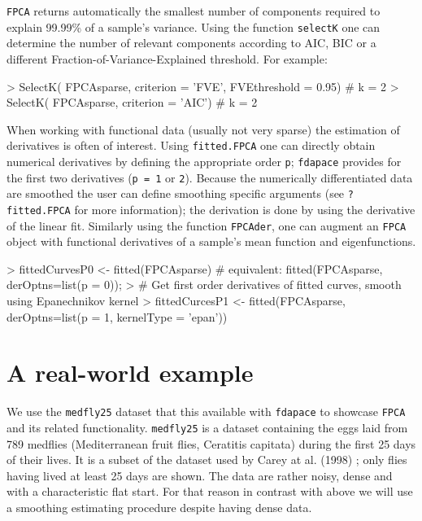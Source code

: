 \documentclass[11pt,english]{article}
\begin{document}
\vspace{-0.33cm}
\texttt{FPCA} returns automatically the smallest number of components required to explain 99.99\% of a sample's variance. Using the function \texttt{selectK} one can determine the number of relevant components according to AIC, BIC or a different Fraction-of-Variance-Explained threshold. For example:
\begin{Schunk}
\begin{Sinput}
> SelectK( FPCAsparse, criterion = 'FVE', FVEthreshold = 0.95) # k = 2
> SelectK( FPCAsparse, criterion = 'AIC') # k = 2
\end{Sinput}
\end{Schunk}
\vspace{-0.33cm}
When working with functional data (usually not very sparse) the estimation of derivatives is often of interest. Using \texttt{fitted.FPCA} one can directly obtain numerical derivatives by defining the appropriate order \texttt{p}; \texttt{fdapace} provides for the first two derivatives (\texttt{p = 1} or \texttt{2}). Because the numerically differentiated data are smoothed the user can define smoothing specific arguments (see \texttt{?fitted.FPCA} for more information); the derivation is done by using the derivative of the linear fit. Similarly using the function  \texttt{FPCAder}, one can augment an \texttt{FPCA} object with functional derivatives of a sample's mean function and eigenfunctions. 

\begin{Schunk}
\begin{Sinput}
> fittedCurvesP0 <- fitted(FPCAsparse) # equivalent: fitted(FPCAsparse, derOptns=list(p = 0));
> # Get first order derivatives of fitted curves, smooth using Epanechnikov kernel
> fittedCurcesP1 <- fitted(FPCAsparse, derOptns=list(p = 1, kernelType = 'epan')) 
\end{Sinput}
\end{Schunk}

\section{A real-world example}

We use the \texttt{medfly25} dataset that this available with \texttt{fdapace} to showcase \texttt{FPCA} and its related functionality. \texttt{medfly25} is a dataset containing the eggs laid from 789 medflies (Mediterranean fruit flies, Ceratitis capitata) during the first 25 days of their lives. It is a subset of the dataset used by Carey at al. (1998) \cite{Carey98}; only flies having lived at least 25 days are shown. The data are rather noisy, dense and with a characteristic flat start. For that reason in contrast with above we will use a smoothing estimating procedure despite having dense data.   
\end{document}
